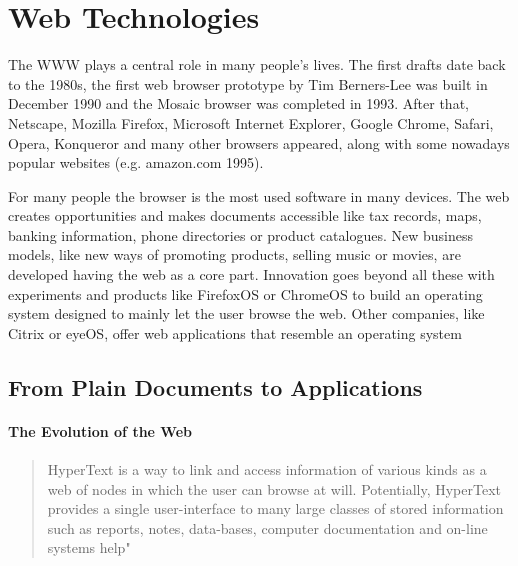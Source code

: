 

\section{Web Technologies}
The \ac{WWW} plays a central role in many people's lives.
The first drafts date back to the 1980s, the first web browser prototype by Tim Berners-Lee was built in December 1990 and the Mosaic browser was completed in 1993.
After that, Netscape, Mozilla Firefox, Microsoft Internet Explorer, Google Chrome, Safari, Opera, Konqueror and many other browsers appeared, along with some nowadays popular websites (e.g. amazon.com 1995).

For many people the browser is the most used software in many devices. 
The web creates opportunities and makes documents accessible like tax records, maps, banking information, phone directories or product catalogues.
New business models, like new ways of promoting products, selling music or movies, are developed having the web as a core part.
Innovation goes beyond all these with experiments and products like FirefoxOS or ChromeOS to build an operating system designed to mainly let the user browse the web. 
Other companies, like Citrix or eyeOS, offer web applications that resemble an operating system %


%
%

\subsection{From Plain Documents to Applications}
\paragraph{The Evolution of the Web}
\begin{quote} 
HyperText is a way to link and access information of various kinds as a web of nodes in which the user can browse at will. Potentially, HyperText provides a single user-interface to many large classes of stored information such as reports, notes, data-bases, computer documentation and on-line systems help" \cite{BernersLee:1990}
\end{quote} 

